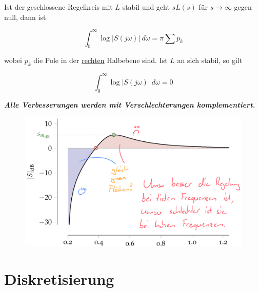 \documentclass[
  10pt,
  a4paper,
  twocolumn]{article}
\numberwithin{equation}{section}
\begin{document}
\begin{tcolorbox}[enhanced jigsaw, colframe=quarto-callout-note-color-frame, toptitle=1mm, title=\textcolor{quarto-callout-note-color}{\faInfo}\hspace{0.5em}{Bode's Integral}, bottomtitle=1mm, opacityback=0, left=2mm, opacitybacktitle=0.6, bottomrule=.15mm, leftrule=.75mm, coltitle=black, titlerule=0mm, colback=white, breakable, toprule=.15mm, colbacktitle=quarto-callout-note-color!10!white, rightrule=.15mm, arc=.35mm]

Ist der geschlossene Regelkreis mit \(L\) stabil und geht \(sL(s)\) für
\(s\rightarrow\infty\) gegen null, dann ist

\[
\int_0^\infty \log\lvert S(j\omega)\rvert\ d\omega = \pi \sum p_k
\]

wobei \(p_k\) die Pole in der \ul{rechten} Halbebene sind. Ist \(L\) an
sich stabil, so gilt

\[
\int_0^\infty\log\lvert S(j\omega)\rvert\ d\omega = 0
\]

\textbf{\emph{Alle Verbesserungen werden mit Verschlechterungen
komplementiert.}}

\begin{figure}[H]

{\centering \includegraphics{images/paste-81.png}

}

\end{figure}

\end{tcolorbox}

\hypertarget{diskretisierung}{%
\section{Diskretisierung}\label{diskretisierung}}
\end{document}
